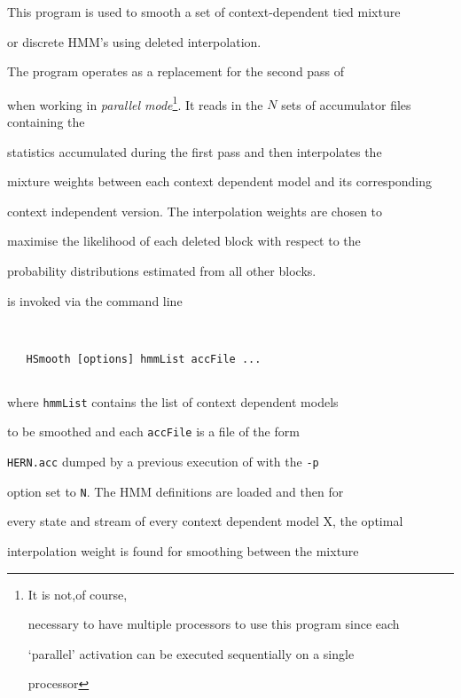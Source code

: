

This program is used to smooth a set of context-dependent tied mixture


or discrete HMM's using deleted interpolation.  


The program operates as a replacement for the second pass of 


when working in {\it parallel mode}\footnote{It is not,of course,


necessary to have multiple processors to use this program since each 


`parallel' activation can be executed sequentially on a single


processor}.  It reads in the $N$ sets of accumulator files containing the


statistics accumulated during the first pass and then interpolates the


mixture weights between each context dependent model and its corresponding 


context independent version.  The interpolation weights are chosen to 


maximise the likelihood of each deleted block with respect to the 


probability distributions estimated from all other blocks.










 is invoked via the command line


\begin{verbatim}


   HSmooth [options] hmmList accFile ...


\end{verbatim}


where {\tt hmmList} contains the list of context dependent models


to be smoothed and each {\tt accFile} is a file of the form


{\tt HERN.acc} dumped by a previous execution of  with the {\tt -p}


option set to {\tt N}.  The HMM definitions are loaded and then for


every state and stream of every context dependent model X, the optimal


interpolation weight is found for smoothing between the mixture


